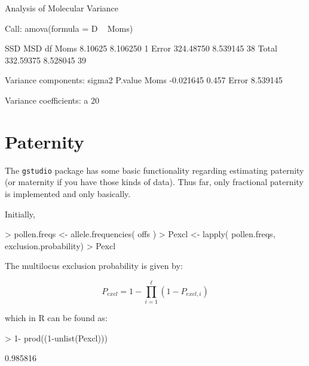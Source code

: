\documentclass[letterpaper,twoside,openany]{book}
\begin{document}
\begin{Schunk}
\begin{Soutput}
	Analysis of Molecular Variance

Call: amova(formula = D ~ Moms)

            SSD      MSD df
Moms    8.10625 8.106250  1
Error 324.48750 8.539145 38
Total 332.59375 8.528045 39

Variance components:
         sigma2 P.value
Moms  -0.021645   0.457
Error  8.539145        

Variance coefficients:
 a 
20 
\end{Soutput}
\end{Schunk}

\section{Paternity}

The \texttt{gstudio} package has some basic functionality regarding estimating paternity (or maternity if you have those kinds of data).  Thus far, only fractional paternity is implemented and only basically.  

Initially, 

\begin{Schunk}
\begin{Sinput}
> pollen.freqs <- allele.frequencies( offs )
> Pexcl <- lapply( pollen.freqs, exclusion.probability)
> Pexcl
\end{Sinput}
\end{Schunk}

The multilocus exclusion probability is given by:

\[
P_{excl} = 1 - \prod_{i=1}^\ell(1-P_{excl,i})
\]

which in R can be found as:

\begin{Schunk}
\begin{Sinput}
> 1- prod((1-unlist(Pexcl)))
\end{Sinput}
\begin{Soutput}
[1] 0.985816
\end{Soutput}
\end{Schunk}
\end{document}
